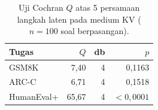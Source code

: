 \begin{table}[htbp]
\centering
\caption{Uji Cochran $Q$ atas 5 persamaan langkah laten pada medium KV ($n=100$ soal berpasangan).}
\label{tab:cochran}
\begin{tabular}{lrrr}
\hline
Tugas & $Q$ & db & $p$ \\
\hline
GSM8K & 7,40 & 4 & 0,1163 \\
ARC-C & 6,71 & 4 & 0,1518 \\
HumanEval+ & 65,67 & 4 & $<0{,}0001$ \\
\hline
\end{tabular}
\end{table}
